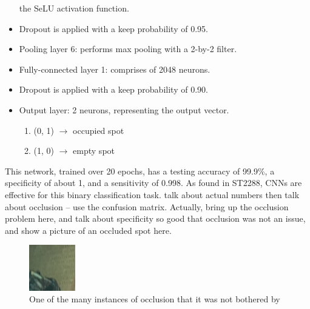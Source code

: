 \documentclass[a4paper, 11pt]{article} %
\begin{document}
\begin{itemize}
		the SeLU activation function.
		\item[] Dropout is applied with a keep probability of 0.95.
		\item[] Pooling layer 6: performs max pooling with a 2-by-2 filter.
		\item[] Fully-connected layer 1: comprises of 2048 neurons.
		\item[] Dropout is applied with a keep probability of 0.90.
		\item[] Output layer: 2 neurons, representing the output vector.
		\vspace*{-4mm}
		\begin{enumerate}
			\setlength\itemsep{-3mm}
			\item[] (0, 1) $\rightarrow$ occupied spot
			\item[] (1, 0) $\rightarrow$ empty spot
		\end{enumerate}
	\end{itemize}
	This network, trained over 20 epochs, has a testing accuracy of 99.9\%, a specificity of about 1, and a
	sensitivity of 0.998. As found in ST2288, CNNs are effective for this 
	binary classification task. talk about actual numbers then talk about 
	occlusion -- use the confusion matrix.
	Actually, bring up the occlusion problem here, and talk about specificity 
	so good that occlusion was not an issue, and show a picture of an occluded 
	spot here.
	\begin{figure}
		\centering
		\includegraphics[width=2cm]{figures/nuslot_occlusion}
		\caption{One of the many instances of occlusion that it was not 
		bothered by}
	\end{figure}
\end{document}
